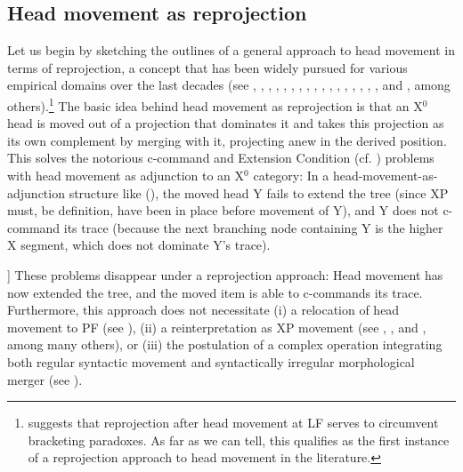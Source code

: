 \documentclass[output=paper
,modfonts
,nonflat]{langsci/langscibook}
\begin{document}
	\subsection{Head movement as reprojection}
	
	Let us begin by sketching the outlines of a general approach to head
	movement in terms of reprojection, a concept that has been widely
	pursued for various empirical domains over the last decades (see
	\citealt{Pesetsky:85}, \citealt{StechowSternefeld:88},
	\citealt{Sternefeld:89}, \citealt{Holmberg:91}, \citealt{Ackemaetal:93},
	\citealt{Kiss:95}, \citealt{Koeneman:00}, \citealt{Haider:00:bra},
	\citealt{Bhatt:02}, \citealt{HornsteinUriagereka:02},
	\citealt{Fanselow:03,Fanselow:09:boo}, \citealt{Bury:03}, \citealt{Suranyi:05},
	\citealt{Donati:06}, \citealt{BayerBrandner:08},
	\citealt{GeorgiMueller:10:rep}, \citealt{Mueller:11:loc}, and
	\citealt{SMueller:15}, among others).\footnote{\citet{Pesetsky:85}
		suggests that reprojection after head movement at LF serves to
		circumvent bracketing paradoxes. As far as we can tell, this
		qualifies as the first instance of a reprojection approach to head
		movement in the literature.} The basic idea behind head movement as
	reprojection is that an X$^0$ head is moved out of a projection that dominates it 
	and takes this projection as its own complement by merging with it,
	projecting anew in the derived position. This solves the notorious
	c-command and Extension Condition (cf. \citealt{Chomsky:95}) problems with head movement as
	adjunction to an X$^0$ category: In a head-movement-as-adjunction structure like (\Next),
	the moved head Y fails to extend the tree (since XP must, be
	definition, have been in place before movement of Y), and Y does not
	c-command its trace (because the next branching node containing Y is
	the higher X segment, which does not dominate Y's trace).
	
	\ea\label{ex:mueller:23}\relax [\sub{XP} [\sub{X} Y\sub{1} X~] [\sub{WP} ... t\sub{1} ...~]]\z
	These problems disappear under a reprojection approach:  Head movement has now extended the
	tree, and the moved item is able to c-commands its
	trace. Furthermore, this approach does not 
	necessitate (i) a relocation of head movement to PF (see
	\citealt{Chomsky:00}), (ii) a
	reinterpretation as XP movement (see \citealt{KoopmanSzabolcsi:00}, \citealt{Mahajan:01},
	and \citealt{Nilsen:03:diss}, among many others), or (iii) the
	postulation of a complex
	operation integrating both regular syntactic movement and
	syntactically irregular morphological merger (see
	\citealt{Matushansky:06}). 
	
\end{document}
